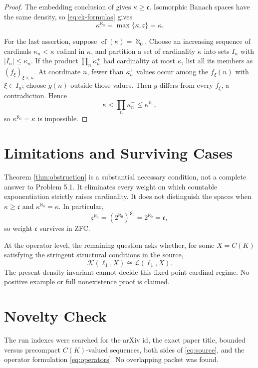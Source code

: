 \documentclass[11pt]{article}
\newcommand{\Kop}{\mathcal K}
\newcommand{\Lop}{\mathcal L}
\newcommand{\cardc}{\mathfrak c}
\begin{document}
\begin{proof}
The embedding conclusion of \cite[Theorem 5.2]{Candido} gives
\(\kappa\ge\cardc\). Isomorphic Banach spaces have the same density, so
\eqref{eq:ck-formulas} gives
\[
 \kappa^{\aleph_0}
 =
 \max\{\kappa,\cardc\}
 =
 \kappa.
\]

For the last assertion, suppose \(\operatorname{cf}(\kappa)=\aleph_0\).
Choose an increasing sequence of cardinals \(\kappa_n<\kappa\) cofinal in
\(\kappa\), and partition a set of cardinality \(\kappa\) into sets \(I_n\)
with \(|I_n|\le\kappa_n\). If the product
\(\prod_n\kappa_n^+\) had cardinality at most \(\kappa\), list all its
members as \((f_\xi)_{\xi<\kappa}\). At coordinate \(n\), fewer than
\(\kappa_n^+\) values occur among the \(f_\xi(n)\) with \(\xi\in I_n\);
choose \(g(n)\) outside those values. Then \(g\) differs from every
\(f_\xi\), a contradiction. Hence
\[
 \kappa
 <
 \prod_n\kappa_n^+
 \le
 \kappa^{\aleph_0},
\]
so \(\kappa^{\aleph_0}=\kappa\) is impossible.
\end{proof}

\section*{Limitations and Surviving Cases}

Theorem \ref{thm:obstruction} is a substantial necessary condition, not a
complete answer to Problem 5.1. It eliminates every weight on which
countable exponentiation strictly raises cardinality. It does not distinguish
the spaces when \(\kappa\ge\cardc\) and
\(\kappa^{\aleph_0}=\kappa\). In particular,
\[
 \cardc^{\aleph_0}
 =
 (2^{\aleph_0})^{\aleph_0}
 =
 2^{\aleph_0}
 =
 \cardc,
\]
so weight \(\cardc\) survives in ZFC.

At the operator level, the remaining question asks whether, for some
\(X=C(K)\) satisfying the stringent structural conditions in the source,
\[
 \Kop(\ell_1,X)\cong\Lop(\ell_1,X).
\]
The present density invariant cannot decide this fixed-point-cardinal regime.
No positive example or full nonexistence proof is claimed.

\section*{Novelty Check}

The run indexes were searched for the arXiv id, the exact paper title,
bounded versus precompact \(C(K)\)-valued sequences, both sides of
\eqref{eq:source}, and the operator formulation \eqref{eq:operators}. No
overlapping packet was found.
\end{document}
